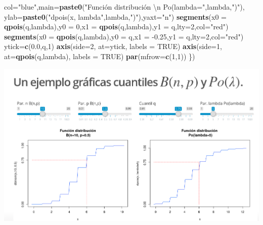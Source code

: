 \documentclass[]{book}
\newenvironment{Shaded}{\begin{snugshade}}{\end{snugshade}}
\newcommand{\CharTok}[1]{\textcolor[rgb]{0.31,0.60,0.02}{#1}}
\newcommand{\DataTypeTok}[1]{\textcolor[rgb]{0.13,0.29,0.53}{#1}}
\newcommand{\DecValTok}[1]{\textcolor[rgb]{0.00,0.00,0.81}{#1}}
\newcommand{\FloatTok}[1]{\textcolor[rgb]{0.00,0.00,0.81}{#1}}
\newcommand{\KeywordTok}[1]{\textcolor[rgb]{0.13,0.29,0.53}{\textbf{#1}}}
\newcommand{\NormalTok}[1]{#1}
\newcommand{\OtherTok}[1]{\textcolor[rgb]{0.56,0.35,0.01}{#1}}
\newcommand{\StringTok}[1]{\textcolor[rgb]{0.31,0.60,0.02}{#1}}
\begin{document}
\begin{Shaded}
\begin{Highlighting}[]
        \DataTypeTok{col=}\StringTok{"blue"}\NormalTok{,}\DataTypeTok{main=}\KeywordTok{paste0}\NormalTok{(}\StringTok{"Función distribución }\CharTok{\textbackslash{}n}\StringTok{ Po(lambda="}\NormalTok{,lambda,}\StringTok{")"}\NormalTok{),}
        \DataTypeTok{ylab=}\KeywordTok{paste0}\NormalTok{(}\StringTok{"dpois(x, lambda"}\NormalTok{,lambda,}\StringTok{")"}\NormalTok{),}\DataTypeTok{yaxt=}\StringTok{"n"}\NormalTok{)}
  \KeywordTok{segments}\NormalTok{(}\DataTypeTok{x0 =} \KeywordTok{qpois}\NormalTok{(q,lambda),}\DataTypeTok{y0 =} \DecValTok{0}\NormalTok{,}\DataTypeTok{x1 =} \KeywordTok{qpois}\NormalTok{(q,lambda),}\DataTypeTok{y1 =}\NormalTok{ q,}\DataTypeTok{lty=}\DecValTok{2}\NormalTok{,}\DataTypeTok{col=}\StringTok{"red"}\NormalTok{)}
  \KeywordTok{segments}\NormalTok{(}\DataTypeTok{x0 =} \KeywordTok{qpois}\NormalTok{(q,lambda),}\DataTypeTok{y0 =}\NormalTok{ q,}\DataTypeTok{x1 =} \FloatTok{-0.25}\NormalTok{,}\DataTypeTok{y1 =}\NormalTok{ q,}\DataTypeTok{lty=}\DecValTok{2}\NormalTok{,}\DataTypeTok{col=}\StringTok{"red"}\NormalTok{)}
\NormalTok{  ytick=}\KeywordTok{c}\NormalTok{(}\FloatTok{0.0}\NormalTok{,q,}\DecValTok{1}\NormalTok{)}
  \KeywordTok{axis}\NormalTok{(}\DataTypeTok{side=}\DecValTok{2}\NormalTok{, }\DataTypeTok{at=}\NormalTok{ytick, }\DataTypeTok{labels =} \OtherTok{TRUE}\NormalTok{)}
  \KeywordTok{axis}\NormalTok{(}\DataTypeTok{side=}\DecValTok{1}\NormalTok{, }\DataTypeTok{at=}\KeywordTok{qpois}\NormalTok{(q,lambda), }\DataTypeTok{labels =} \OtherTok{TRUE}\NormalTok{)}
  \KeywordTok{par}\NormalTok{(}\DataTypeTok{mfrow=}\KeywordTok{c}\NormalTok{(}\DecValTok{1}\NormalTok{,}\DecValTok{1}\NormalTok{))}
\NormalTok{\})}
\end{Highlighting}
\end{Shaded}

\href{https://joanby.shinyapps.io/DistribucionesNotables/}{\includegraphics{Images/noshinyImages/interactiva_cuantiles1.png}}
\end{document}
